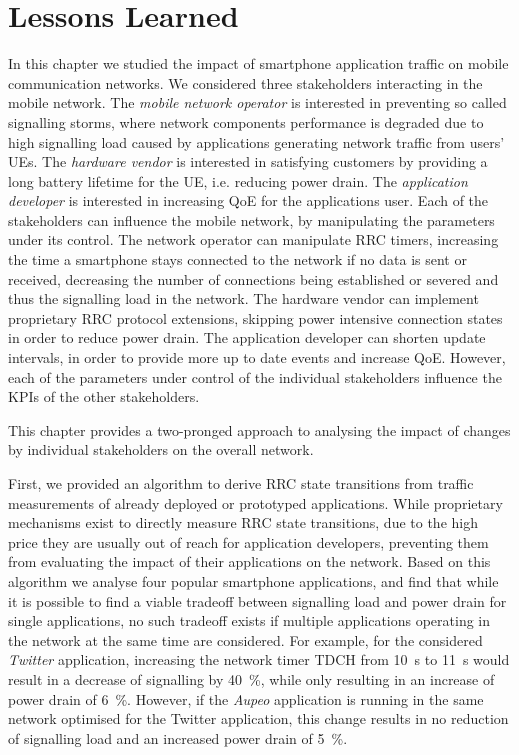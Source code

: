 \section{Lessons Learned}\label{sec:network:lessons_learned}
In this chapter we studied the impact of smartphone application traffic on mobile communication networks.
We considered three stakeholders interacting in the mobile network.
The \emph{mobile network operator} is interested in preventing so called signalling storms, where network components performance is degraded due to high signalling load caused by applications generating network traffic from users' \glspl{UE}.
The \emph{hardware vendor} is interested in satisfying customers by providing a long battery lifetime for the \gls{UE}, i.e. reducing power drain.
The \emph{application developer} is interested in increasing \gls{QoE} for the applications user.
Each of the stakeholders can influence the mobile network, by manipulating the parameters under its control.
The network operator can manipulate \gls{RRC} timers, increasing the time a smartphone stays connected to the network if no data is sent or received, decreasing the number of connections being established or severed and thus the signalling load in the network. 
The hardware vendor can implement proprietary \gls{RRC} protocol extensions, skipping power intensive connection states in order to reduce power drain.
The application developer can shorten update intervals, in order to provide more up to date events and increase \gls{QoE}.
However, each of the parameters under control of the individual stakeholders influence the \glspl{KPI} of the other stakeholders.

This chapter provides a two-pronged approach to analysing the impact of changes by individual stakeholders on the overall network.

First, we provided an algorithm to derive \gls{RRC} state transitions from traffic measurements of already deployed or prototyped applications.
While proprietary mechanisms exist to directly measure \gls{RRC} state transitions, due to the high price they are usually out of reach for application developers, preventing them from evaluating the impact of their applications on the network.
Based on this algorithm we analyse four popular smartphone applications, and find that while it is possible to find a viable tradeoff between signalling load and power drain for single applications, no such tradeoff exists if multiple applications operating in the network at the same time are considered.
For example, for the considered \emph{Twitter} application, increasing the network timer \gls{TDCH} from \SI{10}{\second} to \SI{11}{\second} would result in a decrease of signalling by \SI{40}{\percent}, while only resulting in an increase of power drain of \SI{6}{\percent}.
However, if the \emph{Aupeo} application is running in the same network optimised for the Twitter application, this change results in no reduction of signalling load and an increased power drain of \SI{5}{\percent}. 

